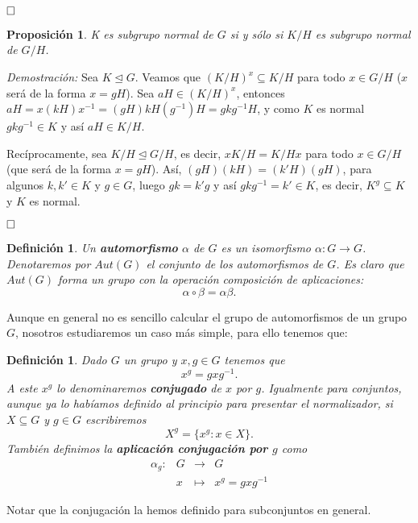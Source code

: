 \documentclass[12pt]{article}
\newtheorem{proposition}[theorem]{Proposición}
\newtheorem{definition}[theorem]{Definición}
\begin{document}
$\hfill \square$

\begin{proposition}\label{eq:ej32} K es subgrupo normal de $G$ si y sólo si $K/H$ es subgrupo normal de $G/H$.\end{proposition}

\emph{Demostración: }Sea $K \unlhd G$. Veamos que $(K/H)^x \subseteq K/H$ para todo $x \in G/H$ ($x$ será de la forma $x=gH$). Sea $aH \in (K/H)^x$, entonces $aH = x(kH)x^{-1} = (gH)kH(g^{-1})H = gkg^{-1}H$, y como $K$ es normal $gkg^{-1} \in K$ y así $aH \in K/H$.

Recíprocamente, sea $K/H \unlhd G/H$, es decir, $xK/H = K/Hx$ para todo $x \in G/H$ (que será de la forma $x =gH$). Así, $(gH)(kH) = (k'H)(gH)$, para algunos $k,k' \in K$ y $g\in G$, luego $gk = k'g$ y así $gkg^{-1} = k' \in K$, es decir, $K^g \subseteq K$ y $K$ es normal. 

$\hfill \square$

\begin{definition}Un \textbf{automorfismo} $\alpha$ de $G$ es un isomorfismo $\alpha \colon G \longrightarrow G$. Denotaremos por $Aut(G)$ el conjunto de los automorfismos de $G$. Es claro que $Aut(G)$ forma un grupo con la operación composición de aplicaciones: $$\alpha \circ \beta = \alpha \beta.$$
\end{definition}

Aunque en general no es sencillo calcular el grupo de automorfismos de un grupo $G$, nosotros estudiaremos un caso más simple, para ello tenemos que:

\begin{definition} Dado $G$ un grupo y $x,g \in G$ tenemos que $$x^g=gxg^{-1}.$$ A este $x^g$ lo denominaremos \textbf{conjugado} de $x$ por $g$. Igualmente para conjuntos, aunque ya lo habíamos definido al principio para presentar el normalizador, si $X \subseteq G$ y $g \in G$ escribiremos $$X^g = \lbrace x^g:x \in X \rbrace.$$ También definimos la \textbf{aplicación conjugación por $g$} como $$\begin{array}{rccl}
\alpha_g \colon &G&\longrightarrow &G \\
&x& \longmapsto &x^g = gxg^{-1}
\end{array}
$$
\end{definition}

Notar que la conjugación la hemos definido para subconjuntos en general.
\end{document}
